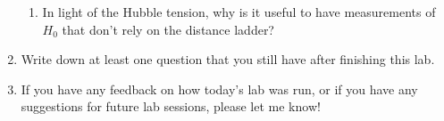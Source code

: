 \documentclass[11pt]{article}
\begin{document}
\begin{enumerate}[resume]
\begin{enumerate}
        \item In light of the Hubble tension, why is it useful to have measurements of $H_0$ that don't rely on the distance ladder?
    \end{enumerate}

    \item Write down at least one question that you still have after finishing this lab.
    
    \item If you have any feedback on how today's lab was run, or if you have any suggestions for future lab sessions, please let me know! 
    
    
\end{enumerate}
\end{document}
